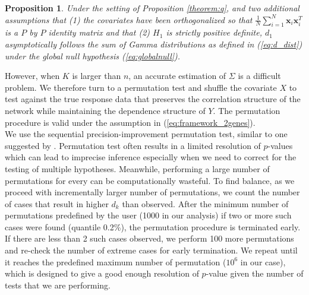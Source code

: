\documentclass[aap,authoryear, preprint]{imsart}
\numberwithin{equation}{section}
\theoremstyle{plain}
\newtheorem{prop}{Proposition}
\begin{document}
\begin{prop}
Under the setting of Proposition \ref{theorem:q}, and two additional assumptions that (1) the covariates have been orthogonalized so that 
$\frac{1}{N} \sum_{i=1}^{N} \bm{x}_i \bm{x}_i^T$ is a $P$ by $P$ identity matrix and that (2) $H_1$ is strictly positive definite, $d_1$ asymptotically follows the sum of Gamma distributions as defined in (\ref{eq:d_dist}) under the global null hypothesis (\ref{eq:globalnull}). 
\end{prop}

However, when $K$ is larger than $n$, an accurate estimation of $\Sigma$ is a difficult problem. We therefore turn to a permutation test and shuffle the covariate $X$ to test against the true response data that preserves the correlation structure of the network while maintaining the dependence structure of $Y$. The permutation procedure is valid under the assumption in (\ref{eq:framework_2genes}). \\

We use the sequential precision-improvement permutation test, similar to one suggested by \cite{chen2012exponential}. Permutation test often results in a limited resolution of $p$-values which can lead to imprecise inference especially when we need to correct for the testing of multiple hypotheses. Meanwhile, performing a large number of permutations for every can be computationally wasteful. To find balance, as we proceed with incrementally larger number of permutations, we count the number of cases that result in higher $d_k$ than observed. After the minimum number of permutations predefined by the user (1000 in our analysis) if two or more such cases were found (quantile 0.2\%), the permutation procedure is terminated early. If there are less than 2 such cases observed, we perform 100 more permutations and re-check the number of extreme cases for early termination. We repeat until it reaches the predefined maximum number of permutation ($10^6$ in our case), which is designed to give a good enough resolution of $p$-value given the number of tests that we are performing. 
\end{document}
